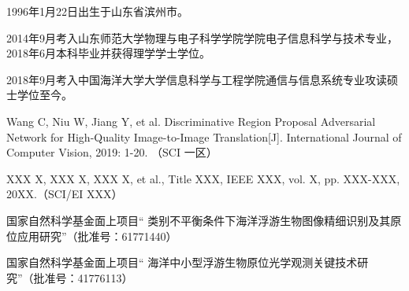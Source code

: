 \begin{resume}


  1996年1月22日出生于山东省滨州市。

  2014年9月考入山东师范大学物理与电子科学学院学院电子信息科学与技术专业，2018年6月本科毕业并获得理学学士学位。
  
  2018年9月考入中国海洋大学大学信息科学与工程学院通信与信息系统专业攻读硕士学位至今。


  \begin{publications}
    \item Wang C, Niu W, Jiang Y, et al. Discriminative Region Proposal Adversarial Network for High-Quality Image-to-Image Translation[J]. International Journal of Computer Vision, 2019: 1-20.
    （SCI 一区）
  \end{publications}

  \begin{publications}[before=\publicationskip,after=\publicationskip]
    \item XXX X, XXX X, XXX X, et al., Title XXX, IEEE XXX, vol. X, pp. XXX-XXX, 20XX.（SCI/EI XXX）
  \end{publications}


  \begin{achievements}
    \item 国家自然科学基金面上项目“ 类别不平衡条件下海洋浮游生物图像精细识别及其原位应用研究”（批准号：61771440）
    \item 国家自然科学基金面上项目“ 海洋中小型浮游生物原位光学观测关键技术研究”（批准号：41776113）

  \end{achievements}

\end{resume}
